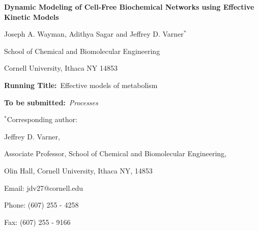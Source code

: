 \documentclass[12pt]{article}
\begin{document}
\begin{titlepage}
{\par\centering\textbf{\Large Dynamic Modeling of Cell-Free Biochemical Networks using Effective Kinetic Models}}
\vspace{0.05in}
{\par \centering \large{Joseph A. Wayman, Adithya Sagar and Jeffrey D. Varner$^{*}$}}
\vspace{0.10in}
{\par \centering \large{School of Chemical and Biomolecular Engineering}}
{\par \centering \large{Cornell University, Ithaca NY 14853}}
\vspace{0.1in}
{\par \centering \textbf{Running Title:}~Effective models of metabolism}
\vspace{0.1in}
{\par \centering \textbf{To be submitted:}~\emph{Processes}}
\vspace{0.5in}
{\par \centering $^{*}$Corresponding author:}
{\par \centering Jeffrey D. Varner,}
{\par \centering Associate Professor, School of Chemical and Biomolecular Engineering,}
{\par {} Olin Hall, Cornell University, Ithaca NY, 14853} 
{\par \centering Email: jdv27@cornell.edu} 
{\par \centering Phone: (607) 255 - 4258}
{\par \centering Fax: (607) 255 - 9166}
\end{titlepage}
\date{}
\thispagestyle{empty}
\pagebreak
\end{document}
